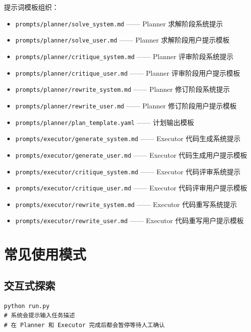 \documentclass[12pt,a4paper]{ctexart}
\begin{document}
提示词模板组织：
\begin{itemize}[itemsep=2pt]
    \item \texttt{prompts/planner/solve\_system.md} —— Planner 求解阶段系统提示
    \item \texttt{prompts/planner/solve\_user.md} —— Planner 求解阶段用户提示模板
    \item \texttt{prompts/planner/critique\_system.md} —— Planner 评审阶段系统提示
    \item \texttt{prompts/planner/critique\_user.md} —— Planner 评审阶段用户提示模板
    \item \texttt{prompts/planner/rewrite\_system.md} —— Planner 修订阶段系统提示
    \item \texttt{prompts/planner/rewrite\_user.md} —— Planner 修订阶段用户提示模板
    \item \texttt{prompts/planner/plan\_template.yaml} —— 计划输出模板
    \item \texttt{prompts/executor/generate\_system.md} —— Executor 代码生成系统提示
    \item \texttt{prompts/executor/generate\_user.md} —— Executor 代码生成用户提示模板
    \item \texttt{prompts/executor/critique\_system.md} —— Executor 代码评审系统提示
    \item \texttt{prompts/executor/critique\_user.md} —— Executor 代码评审用户提示模板
    \item \texttt{prompts/executor/rewrite\_system.md} —— Executor 代码重写系统提示
    \item \texttt{prompts/executor/rewrite\_user.md} —— Executor 代码重写用户提示模板
\end{itemize}

\section{常见使用模式}

\subsection{交互式探索}

\begin{lstlisting}[style=bashcode]
python run.py
# 系统会提示输入任务描述
# 在 Planner 和 Executor 完成后都会暂停等待人工确认
\end{lstlisting}
\end{document}
